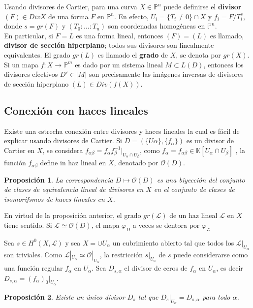 \documentclass[12pt,a4paper]{report}
\newcommand{\Ou}{\mathscr{O}}
\newcommand{\ep}{\mathbb{P}^{n}}
\newcommand{\K}{\mathbb{K}}
\newcommand{\Li}{\mathscr{L}}
\newtheorem{prop}{Proposición}[chapter]
\begin{document}
Usando divisores de Cartier, para una curva $X \in \ep$ puede definirse el \textbf{divisor $(F) \in Div X$} de una forma $F $ en $\ep$. En efecto, $U_{i} = \{ T_{i} \neq 0 \} \cap X$ y $f_{i} = F/T^{s}_{i}$, donde $s = gr (F)$ y $(T_{0} : \ldots : T_{n})$ son coordenadas homogéneas en $\ep$.\\
En particular, si $F=L$ es una forma lineal, entonces $(F)=(L)$ es llamado, \textbf{divisor de sección hiperplano}; todos sus divisores son linealmente equivalentes. El grado $gr(L)$ es llamado el \textbf{grado} de $X$, se denota por $gr (X)$. Si un mapa $f:X \rightarrow \mathbb{P}^{m}$ es dado por un sistema lineal $M \subset L(D)$, entonces los divisores efectivos $D' \in |M|$ son precisamente las imágenes inversas de divisores de sección hiperplano $(L) \in Div (f(X)) $. 

\subsection{Conexión con haces lineales} 
Existe una estrecha conexión entre divisores y haces lineales la cual es fácil de explicar usando divisores de Cartier. Si $ D= ( \{ U{\alpha} \} , \{f_{\alpha} \}  )$ es un divisor de Cartier en $X$, se considera $f_{\alpha \beta} = f_{\alpha}f_{\beta}^{-1} | _{ U_{\alpha} \cap U_{\beta} }$, como $f_\alpha = f_{\alpha \beta} \in \K[ U _{ \alpha} \cap U_{\beta} ] $ , la función $f_{\alpha \beta}$ define in haz lineal en $X$, denotado por $\Ou (D)$. 
	
\begin{prop}
	La correspondencia $D \mapsto \Ou (D)$ es una biyección del conjunto de clases de equivalencia lineal de divisores en $X$ en el conjunto de clases de isomorifsmos de haces lineales en $X$.
\end{prop}

En virtud de la proposición anterior, el grado $gr (\Li)$ de un haz lineal $\Li$ en $X$ tiene sentido. Si $\Li \simeq \Ou (D)$, el mapa $\varphi _{D} $ a veces se dentora por $ \varphi _{\Li}$

Sea $s \in H^{0} (X, \Li) $ y sea $X = \cup U_{ \alpha}$ un cubrimiento abierto tal que todos los $\Li|_{U_{\alpha}}$ son triviales. Como $\Li|_{U_{\alpha}} \simeq \Ou|_{U_{\alpha}} $, la restricción $s|_{U_{\alpha}}$ de $s$ puede considerarse como una función regular $f_ \alpha$ en $U_{\alpha}$. Sea $D_{s, \alpha }$ el divisor de ceros de $f_{\alpha}$ en $U_{\alpha}$, es decir $D_{s, \alpha} = (f_{\alpha})_{0}|_{U_{\alpha}}$.

\begin{prop}
	Existe un único divisor $D_{s}$ tal que $ D_{s}|_{U_{\alpha}} = D_{s,\alpha} $ para todo $\alpha$. 
\end{prop}
\end{document}
